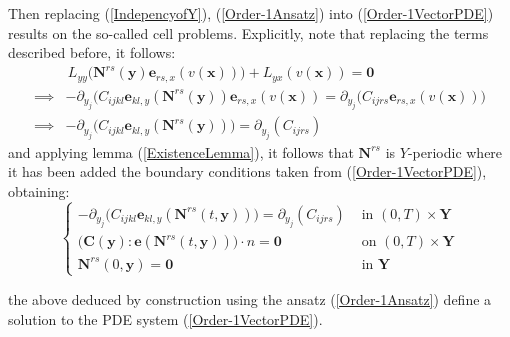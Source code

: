 Then replacing (\ref{IndepencyofY}), (\ref{Order-1Ansatz}) into (\ref{Order-1VectorPDE}) results on the so-called cell problems. Explicitly, note that replacing the terms described before, it follows:
\begin{align*}
    &\,L_{yy} \big( \mathbf{N}^{rs} (\mathbf{y}) \mathbf{e}_{rs,x} (v(\mathbf{x})) \big) + L_{yx}(v(\mathbf{x}) ) = \mathbf{0} \\
    \implies& -\partial_{y_j} \big( C_{ijkl}\mathbf{e}_{kl,y}(\mathbf{N}^{rs}(\mathbf{y}) ) \mathbf{e}_{rs,x}(v(\mathbf{x})) = \partial_{y_j} \big( C_{ijrs}\mathbf{e}_{rs,x}(v(\mathbf{x})) \big) \\
    \implies& - \partial_{y_j} \big( C_{ijkl} \mathbf{e}_{kl,y} (\mathbf{N}^{rs}(\mathbf{y})) \big) = \partial_{y_j} (C_{ijrs})
\end{align*}
and applying lemma (\ref{ExistenceLemma}), it follows that $\mathbf{N}^{rs}$ is $Y$-periodic where it has been added the boundary conditions taken from (\ref{Order-1VectorPDE}), obtaining:
\begin{equation*}
    \left \{
    \begin{array}{cc}
         - \partial_{y_j} \big( C_{ijkl} \mathbf{e}_{kl,y} (\mathbf{N}^{rs}(t,\mathbf{y})) \big) = \partial_{y_j} (C_{ijrs}) & \text{ in } (0,T)\times \mathbf{Y} \\
        \big( \mathbf{C}(\mathbf{y}) : \mathbf{e}(\mathbf{N}^{rs}(t,\mathbf{y})) \big) \cdot n = \mathbf{0} & \text{ on } (0,T)\times \mathbf{Y}\\
        \mathbf{N}^{rs} (0, \mathbf{y}) = \mathbf{0} &  \text{ in } \mathbf{Y}
    \end{array}
    \right.
\end{equation*}

the above deduced by construction using the ansatz (\ref{Order-1Ansatz}) define a solution to the PDE system (\ref{Order-1VectorPDE}).

